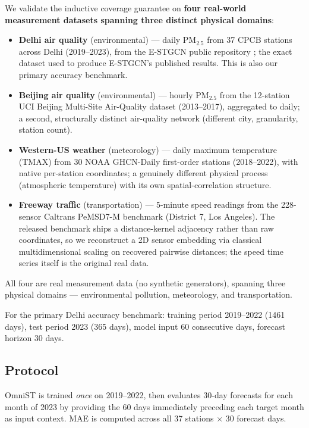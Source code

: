 \documentclass[journal]{IEEEtran}
\begin{document}
We validate the inductive coverage guarantee on \textbf{four real-world measurement datasets spanning three distinct physical domains}:
\begin{itemize}
\item \textbf{Delhi air quality} (environmental) --- daily PM$_{2.5}$ from 37 CPCB stations across Delhi (2019--2023), from the E-STGCN public repository \cite{panja2026estgcn}; the exact dataset used to produce E-STGCN's published results. This is also our primary accuracy benchmark.
\item \textbf{Beijing air quality} (environmental) --- hourly PM$_{2.5}$ from the 12-station UCI Beijing Multi-Site Air-Quality dataset \cite{zhang2017beijingair} (2013--2017), aggregated to daily; a second, structurally distinct air-quality network (different city, granularity, station count).
\item \textbf{Western-US weather} (meteorology) --- daily maximum temperature (TMAX) from 30 NOAA GHCN-Daily first-order stations (2018--2022), with native per-station coordinates; a genuinely different physical process (atmospheric temperature) with its own spatial-correlation structure.
\item \textbf{Freeway traffic} (transportation) --- 5-minute speed readings from the 228-sensor Caltrans PeMSD7-M benchmark \cite{yu2018stgcn} (District 7, Los Angeles). The released benchmark ships a distance-kernel adjacency rather than raw coordinates, so we reconstruct a 2D sensor embedding via classical multidimensional scaling on recovered pairwise distances; the speed time series itself is the original real data.
\end{itemize}
All four are real measurement data (no synthetic generators), spanning three physical domains --- environmental pollution, meteorology, and transportation.

For the primary Delhi accuracy benchmark: training period 2019--2022 (1461 days), test period 2023 (365 days), model input 60 consecutive days, forecast horizon 30 days.

\subsection{Protocol}

OmniST is trained \emph{once} on 2019--2022, then evaluates 30-day forecasts for each month of 2023 by providing the 60 days immediately preceding each target month as input context. MAE is computed across all 37 stations $\times$ 30 forecast days.
\end{document}
